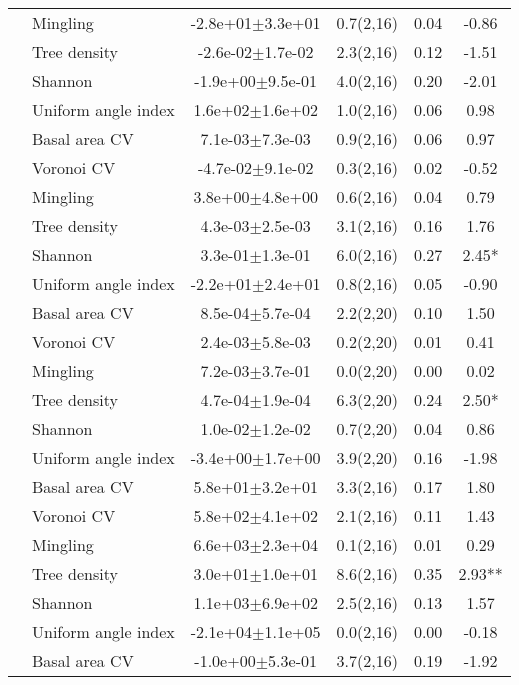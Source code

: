 \begin{table}[ht]
\begin{tabular}{llcccS[table-format=-2.2, table-space-text-post = {***}]}
   & Mingling & -2.8e+01$\pm$3.3e+01 & 0.7(2,16) & 0.04 & -0.86 \\ 
   & Tree density & -2.6e-02$\pm$1.7e-02 & 2.3(2,16) & 0.12 & -1.51 \\ 
   & Shannon & -1.9e+00$\pm$9.5e-01 & 4.0(2,16) & 0.20 & -2.01 \\ 
   & Uniform angle index &  1.6e+02$\pm$1.6e+02 & 1.0(2,16) & 0.06 & 0.98 \\ 
   \midrule
{} & Basal area CV &  7.1e-03$\pm$7.3e-03 & 0.9(2,16) & 0.06 & 0.97 \\ 
   & Voronoi CV & -4.7e-02$\pm$9.1e-02 & 0.3(2,16) & 0.02 & -0.52 \\ 
   & Mingling &  3.8e+00$\pm$4.8e+00 & 0.6(2,16) & 0.04 & 0.79 \\ 
   & Tree density &  4.3e-03$\pm$2.5e-03 & 3.1(2,16) & 0.16 & 1.76 \\ 
   & Shannon &  3.3e-01$\pm$1.3e-01 & 6.0(2,16) & 0.27 & 2.45* \\ 
   & Uniform angle index & -2.2e+01$\pm$2.4e+01 & 0.8(2,16) & 0.05 & -0.90 \\ 
   \midrule
{} & Basal area CV &  8.5e-04$\pm$5.7e-04 & 2.2(2,20) & 0.10 & 1.50 \\ 
   & Voronoi CV &  2.4e-03$\pm$5.8e-03 & 0.2(2,20) & 0.01 & 0.41 \\ 
   & Mingling &  7.2e-03$\pm$3.7e-01 & 0.0(2,20) & 0.00 & 0.02 \\ 
   & Tree density &  4.7e-04$\pm$1.9e-04 & 6.3(2,20) & 0.24 & 2.50* \\ 
   & Shannon &  1.0e-02$\pm$1.2e-02 & 0.7(2,20) & 0.04 & 0.86 \\ 
   & Uniform angle index & -3.4e+00$\pm$1.7e+00 & 3.9(2,20) & 0.16 & -1.98 \\ 
   \midrule
{} & Basal area CV &  5.8e+01$\pm$3.2e+01 & 3.3(2,16) & 0.17 & 1.80 \\ 
   & Voronoi CV &  5.8e+02$\pm$4.1e+02 & 2.1(2,16) & 0.11 & 1.43 \\ 
   & Mingling &  6.6e+03$\pm$2.3e+04 & 0.1(2,16) & 0.01 & 0.29 \\ 
   & Tree density &  3.0e+01$\pm$1.0e+01 & 8.6(2,16) & 0.35 & 2.93** \\ 
   & Shannon &  1.1e+03$\pm$6.9e+02 & 2.5(2,16) & 0.13 & 1.57 \\ 
   & Uniform angle index & -2.1e+04$\pm$1.1e+05 & 0.0(2,16) & 0.00 & -0.18 \\ 
   \midrule
{} & Basal area CV & -1.0e+00$\pm$5.3e-01 & 3.7(2,16) & 0.19 & -1.92 \\ 

\end{tabular}
\end{table}
